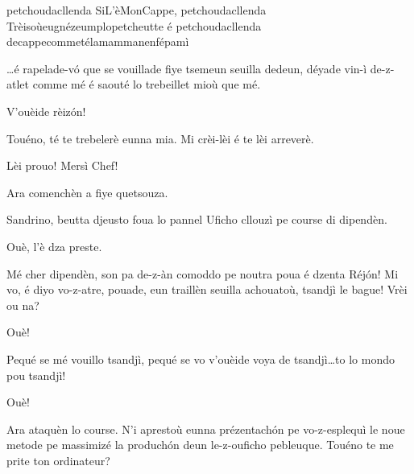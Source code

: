 \begin{drama}



\Saventaspeaks{} petchoudacllenda SiL'èMonCappe, petchoudacllenda Trèisoùeugnézeumplope\-tcheut\-te é pe\-tchou\-dacllenda decappecommetélamammanenfépamì

\Treisouspeaks \ldots é rapelade-v\'o que se vouillade fiye tsemeun seuilla dedeun, déyade vin-ì de-z-atlet comme mé é saouté lo trebeillet mioù que mé. 

\Richardspeaks V'ouèide rèiz\'on! 

\Treisouspeaks{} Touéno, té te trebelerè eunna mia. Mi crèi-lèi é te lèi arreverè.

\Tuenospeaks Lèi prouo! Mersì Chef!

\Treisouspeaks Ara comenchèn a fiye quetsouza.



\Treisouspeaks{} Sandrino, beutta djeusto foua lo pannel  \og Uficho cllouzì pe course di dipendèn\fg.

\Sandrinospeaks Ouè, l’è dza preste.



\Treisouspeaks Mé cher dipendèn, son pa de-z-àn comoddo pe noutra poua é dzenta Réj\'on!
Mi vo, é diyo vo-z-atre, pouade, eun traillèn seuilla achouatoù, tsandjì le bague! Vrèi ou na?

\Tcheuttespeaks{} Ouè!

\Treisouspeaks{} Pequé se mé vouillo tsandjì, pequé se vo v'ou\-èi\-de voya de tsandjì\ldots to lo mondo pou tsandjì!

\Tcheuttespeaks{} Ouè!

\Treisouspeaks Ara ataquèn lo course. N'i aprestoù eunna prézentach\'on pe vo-z-esplequì le noue metode pe massimizé la produch\'on deun le-z-ouficho pebleuque.  Touéno te me prite ton ordinateur?


\end{drama}
